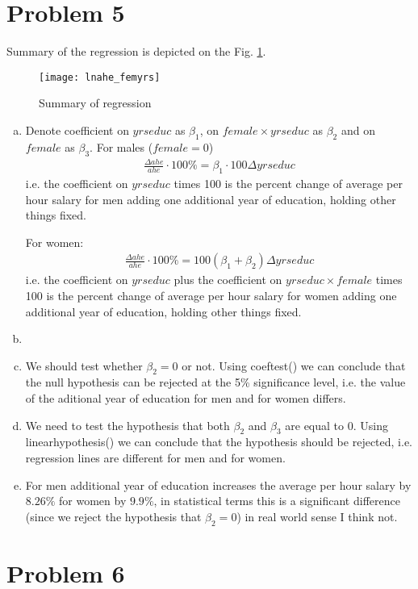 \documentclass[a4paper]{article}
\begin{document}
\section*{Problem 5}
Summary of the regression is depicted on the Fig. \ref{fig1}.

\begin{figure}[H]
	\centering
	\texttt{[image: lnahe\_femyrs]}
	\caption{Summary of regression}\label{fig1}
\end{figure}

\begin{enumerate}[a.]
	\item Denote coefficient on $yrseduc$ as $\beta_1$, on $female\times yrseduc$ as $\beta_2$ and on $female$ as $\beta_3$. For males ($female = 0$)
	\begin{align*}
	\frac{\Delta ahe}{ahe} \cdot 100\% = \beta_1 \cdot 100 \Delta yrseduc
	\end{align*}
	i.e. the coefficient on $yrseduc$ times 100 is the percent change of average per hour salary for men adding one additional year of education, holding other things fixed.
	
	For women:
	\begin{align*}
	\frac{\Delta ahe}{ahe} \cdot 100\% = 100(\beta_1 + \beta_2)\Delta yrseduc
	\end{align*}
	i.e. the coefficient on $yrseduc$ plus the coefficient on $yrseduc \times female$ times 100 is the percent change of average per hour salary for women adding one additional year of education, holding other things fixed.
	\item 
	\item We should test whether $\beta_2 = 0$ or not. Using coeftest() we can conclude that the null hypothesis can be rejected at the 5\% significance level, i.e. the value of the aditional year of education for men and for women differs.
	\item We need to test the hypothesis that both $\beta_2$ and $\beta_3$ are equal to 0. Using linearhypothesis() we can conclude that the hypothesis should be rejected, i.e. regression lines are different for men and for women.
	\item For men additional year of education increases the average per hour salary by $8.26\%$ for women by $9.9\%$, in statistical terms this is a significant difference (since we reject the hypothesis that $\beta_2 = 0$) in real world sense I think not.
\end{enumerate}
\section*{Problem 6}
\end{document}
